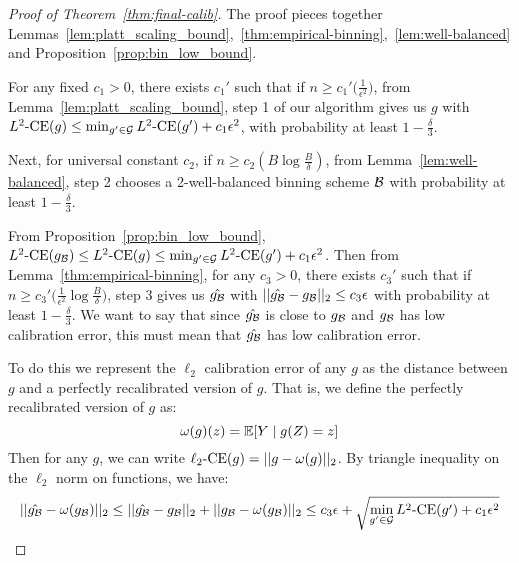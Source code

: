 \begin{proof}[Proof of Theorem~\ref{thm:final-calib}]
The proof pieces together Lemmas~\ref{lem:platt_scaling_bound},~\ref{thm:empirical-binning},~\ref{lem:well-balanced} and Proposition~\ref{prop:bin_low_bound}.

For any fixed $c_1 > 0$, there exists $c_1'$ such that if $n \geq c_1'\big(\frac{1}{\epsilon^2}\big)$, from Lemma~\ref{lem:platt_scaling_bound}, step 1 of our algorithm gives us $g$ with $L^2\textup{-CE}(g) \leq \min_{g' \in \mathcal{G}{}}L^2\textup{-CE}(g') + c_1 \epsilon^2$, with probability at least $1 - \frac{\delta}{3}$.

Next, for universal constant $c_2$, if $n \geq c_2(B \log{\frac{B}{\delta}})$, from Lemma~\ref{lem:well-balanced}, step 2 chooses a 2-well-balanced binning scheme $\mathcal{B}{}$ with probability at least $1 - \frac{\delta}{3}$.

From Proposition~\ref{prop:bin_low_bound}, $L^2\textup{-CE}(g_{\mathcal{B}{}}) \leq L^2\textup{-CE}(g) \leq \min_{g' \in \mathcal{G}{}}L^2\textup{-CE}(g') + c_1 \epsilon^2$. Then from Lemma~\ref{thm:empirical-binning}, for any $c_3 > 0$, there exists $c_3'$ such that if $n \geq c_3'\big(\frac{1}{\epsilon^2} \log{\frac{B}{\delta}}\big)$, step 3 gives us $\hat{g_{\mathcal{B}{}}}$ with $||\hat{g_{\mathcal{B}{}}} - g_{\mathcal{B}{}}||_2 \leq c_3 \epsilon$ with probability at least $1 - \frac{\delta}{3}$. We want to say that since $\hat{g_{\mathcal{B}{}}}$ is close to $g_{\mathcal{B}{}}$ and $g_{\mathcal{B}{}}$ has low calibration error, this must mean that $\hat{g_{\mathcal{B}{}}}$ has low calibration error.

To do this we represent the $\ell_2$ calibration error of any $g$ as the distance between $g$ and a perfectly recalibrated version of $g$. That is, we define the perfectly recalibrated version of $g$ as:
\[ \omega(g)(z) = \mathbb{E}[ Y \mid g(Z) = z ] \]
Then for any $g$, we can write $\ell_2\textup{-CE}(g) = ||g - \omega(g)||_2$. By triangle inequality on the $\ell_2$ norm on functions, we have:
\[ ||\hat{g_{\mathcal{B}{}}} - \omega(g_{\mathcal{B}{}})||_2 \leq ||\hat{g_{\mathcal{B}{}}} - g_{\mathcal{B}{}}||_2 + ||g_{\mathcal{B}{}} - \omega(g_{\mathcal{B}{}})||_2 \leq c_3 \epsilon + \sqrt{\min_{g' \in \mathcal{G}{}}L^2\textup{-CE}(g') + c_1 \epsilon^2} \]


\end{proof}

